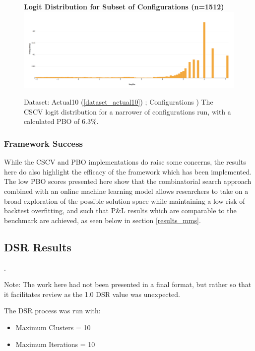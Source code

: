 \documentclass[a4paper,11pt,oneside]{article}
\theoremstyle{plain}
\theoremstyle{definition}
\begin{document}
	\begin{figure}[H]
		\centering 
		\textbf{Logit Distribution for Subset of Configurations (n=1512)}
		\includegraphics[scale=0.25]{images/results/pbo/subset_dist.png} 
		\caption[Logit Distribution for Subset of Configurations]{Dataset: Actual10 (\ref{dataset_actual10}) ; Configurations )
			\newline The CSCV logit distribution for a narrower of configurations run, with a calculated PBO of 6.3\%.}
		\label{figure-results_logits_subset}
	\end{figure}
	
	
	\subsubsection{Framework Success}
	
	
	While the CSCV and PBO implementations do raise some concerns, the results here do also highlight the efficacy of the framework which has been implemented. The low PBO scores presented here show that the combinatorial search approach combined with an online machine learning model allows researchers to take on a broad exploration of the possible solution space while maintaining a low risk of backtest overfitting, and such that P\&L results which are comparable to the benchmark are achieved, as seen below in section \ref{results_mms}.
	
	
	
	\newpage
	
	\subsection{DSR Results}\label{results_dsr}.
	
	
	Note: The work here had not been presented in a final format, but rather so that it facilitates review as the 1.0 DSR value was unexpected. \newline
	
	The DSR process was run with:
	\begin{itemize}
		\item Maximum Clusters = 10
		\item Maximum Iterations = 10
	\end{itemize}
	
\end{document}
